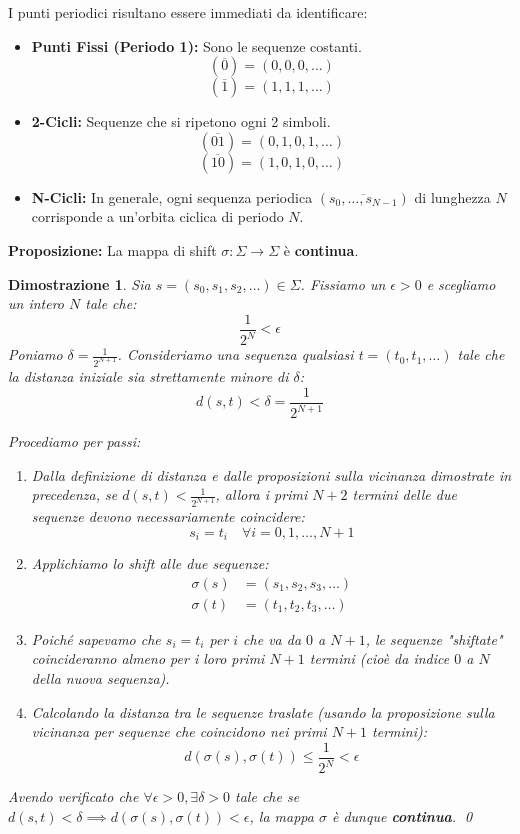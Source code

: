 \documentclass[openany]{book}
\newtheorem*{dimostrazione}{Dimostrazione}
\theoremstyle{definition}
\theoremstyle{remark}
\begin{document}
I punti periodici risultano essere immediati da identificare:
\begin{itemize}
    \item \textbf{Punti Fissi (Periodo 1):} Sono le sequenze costanti.
    $$ (\overline{0}) = (0, 0, 0, \dots) $$
    $$ (\overline{1}) = (1, 1, 1, \dots) $$
    
    \item \textbf{2-Cicli:} Sequenze che si ripetono ogni 2 simboli.
    $$ (\overline{01}) = (0, 1, 0, 1, \dots) $$
    $$ (\overline{10}) = (1, 0, 1, 0, \dots) $$
    
    \item \textbf{N-Cicli:} In generale, ogni sequenza periodica $(\overline{s_0, \dots, s_{N-1}})$ di lunghezza $N$ corrisponde a un'orbita ciclica di periodo $N$.
\end{itemize}


\vspace{1.5em}
\textbf{Proposizione: }
La mappa di shift $\sigma: \Sigma \to \Sigma$ è \textbf{continua}.

\begin{dimostrazione}
Sia $s = (s_0, s_1, s_2, \dots) \in \Sigma$. Fissiamo un $\epsilon > 0$ e scegliamo un intero $N$ tale che:
$$ \frac{1}{2^N} < \epsilon $$
Poniamo $\delta = \frac{1}{2^{N+1}}$. Consideriamo una sequenza qualsiasi $t = (t_0, t_1, \dots)$ tale che la distanza iniziale sia strettamente minore di $\delta$:
$$ d(s, t) < \delta = \frac{1}{2^{N+1}} $$

Procediamo per passi:
\begin{enumerate}
    \item Dalla definizione di distanza e dalle proposizioni sulla vicinanza dimostrate in precedenza, se $d(s, t) < \frac{1}{2^{N+1}}$, allora i primi $N+2$ termini delle due sequenze devono necessariamente coincidere:
    $$ s_i = t_i \quad \forall i = 0, 1, \dots, N+1 $$
    
    \item Applichiamo lo shift alle due sequenze:
    \begin{align*}
        \sigma(s) &= (s_1, s_2, s_3, \dots) \\
        \sigma(t) &= (t_1, t_2, t_3, \dots)
    \end{align*}
    
    \item Poiché sapevamo che $s_i = t_i$ per $i$ che va da $0$ a $N+1$, le sequenze "shiftate" coincideranno almeno per i loro primi $N+1$ termini (cioè da indice $0$ a $N$ della nuova sequenza).
    
    \item Calcolando la distanza tra le sequenze traslate (usando la proposizione sulla vicinanza per sequenze che coincidono nei primi $N+1$ termini):
    $$ d(\sigma(s), \sigma(t)) \leq \frac{1}{2^N} < \epsilon $$
\end{enumerate}
Avendo verificato che $\forall \epsilon > 0, \exists \delta > 0$ tale che se $d(s,t)<\delta \implies d(\sigma(s),\sigma(t))<\epsilon$, la mappa $\sigma$ è dunque \textbf{continua}. \qed
\end{dimostrazione}
\end{document}
